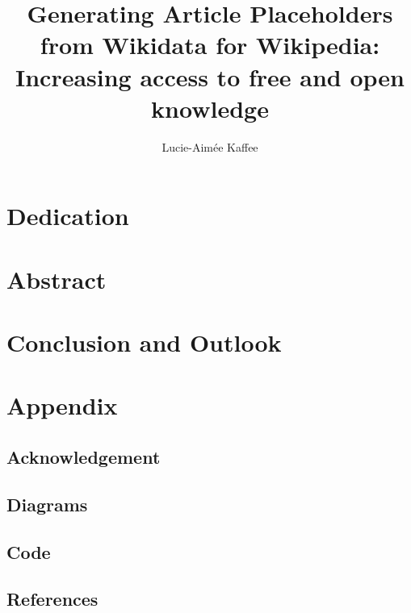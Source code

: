 \documentclass[11pt]{report}
\title{Generating Article Placeholders from Wikidata for Wikipedia:\\Increasing access to free and open knowledge}
\author{Lucie-Aim\'{e}e Kaffee}
\date{}
\begin{document}
\maketitle
\newpage

\chapter*{Dedication}

\chapter*{Abstract}
\newpage

\tableofcontents




\newpage

\newpage

\chapter{Conclusion and Outlook}
\chapter{Appendix}
	\section{Acknowledgement}
	\section{Diagrams}
	\section{Code}
	\section{References}
	
	
\end{document}
